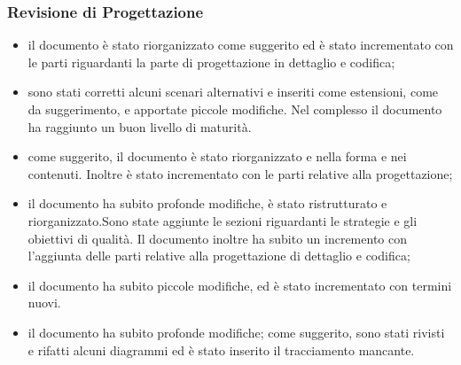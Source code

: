 \subsubsection{Revisione di Progettazione}
\begin{itemize}
\item {} il documento è stato riorganizzato come suggerito ed è stato incrementato con le parti riguardanti la parte di progettazione in dettaglio e codifica;
\item {} sono stati corretti alcuni scenari alternativi e inseriti come estensioni, come da suggerimento, e apportate piccole modifiche. Nel complesso il documento ha raggiunto un buon livello di maturità.
\item {} come suggerito, il documento è stato riorganizzato e nella forma e nei contenuti. Inoltre è stato incrementato con le parti relative alla progettazione;
\item {} il documento ha subito profonde modifiche, è stato ristrutturato e riorganizzato.Sono state aggiunte le sezioni riguardanti le strategie e gli obiettivi di qualità.
Il documento inoltre ha subito un incremento con l'aggiunta delle parti relative alla progettazione di dettaglio e codifica;
\item {} il documento ha subito piccole modifiche, ed è stato incrementato con termini nuovi.
\item {} il documento ha subito profonde modifiche; come suggerito, sono stati rivisti e rifatti alcuni diagrammi ed è stato inserito il tracciamento mancante.
\end{itemize}

